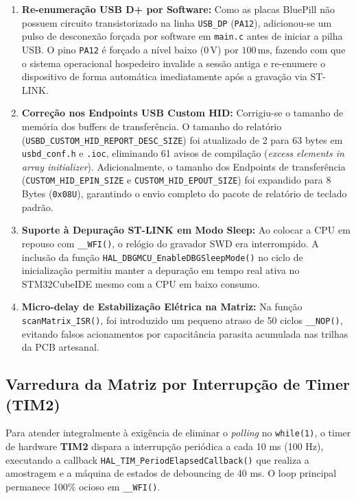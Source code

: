 \documentclass[12pt, a4paper]{article}
\begin{document}
\begin{enumerate}
    \item \textbf{Re-enumeração USB D+ por Software:} Como as placas BluePill não possuem circuito transistorizado na linha \texttt{USB\_DP} (\texttt{PA12}), adicionou-se um pulso de desconexão forçada por software em \texttt{main.c} antes de iniciar a pilha USB. O pino \texttt{PA12} é forçado a nível baixo ($0\,\text{V}$) por $100\,\text{ms}$, fazendo com que o sistema operacional hospedeiro invalide a sessão antiga e re-enumere o dispositivo de forma automática imediatamente após a gravação via ST-LINK.
    \item \textbf{Correção nos Endpoints USB Custom HID:} Corrigiu-se o tamanho de memória dos buffers de transferência. O tamanho do relatório (\texttt{USBD\_CUSTOM\_HID\_REPORT\_DESC\_SIZE}) foi atualizado de 2 para 63 bytes em \texttt{usbd\_conf.h} e \texttt{.ioc}, eliminando 61 avisos de compilação (\textit{excess elements in array initializer}). Adicionalmente, o tamanho dos Endpoints de transferência (\texttt{CUSTOM\_HID\_EPIN\_SIZE} e \texttt{CUSTOM\_HID\_EPOUT\_SIZE}) foi expandido para 8 Bytes (\texttt{0x08U}), garantindo o envio completo do pacote de relatório de teclado padrão.
    \item \textbf{Suporte à Depuração ST-LINK em Modo Sleep:} Ao colocar a CPU em repouso com \texttt{\_\_WFI()}, o relógio do gravador SWD era interrompido. A inclusão da função \texttt{HAL\_DBGMCU\_EnableDBGSleepMode()} no ciclo de inicialização permitiu manter a depuração em tempo real ativa no STM32CubeIDE mesmo com a CPU em baixo consumo.
    \item \textbf{Micro-delay de Estabilização Elétrica na Matriz:} Na função \texttt{scanMatrix\_ISR()}, foi introduzido um pequeno atraso de 50 ciclos \texttt{\_\_NOP()}, evitando falsos acionamentos por capacitância parasita acumulada nas trilhas da PCB artesanal.
\end{enumerate}

\subsection{Varredura da Matriz por Interrupção de Timer (TIM2)}
\hspace*{1.25cm}Para atender integralmente à exigência de eliminar o \textit{polling} no \texttt{while(1)}, o timer de hardware \textbf{TIM2} dispara a interrupção periódica a cada 10 ms (100 Hz), executando a callback \texttt{HAL\_TIM\_PeriodElapsedCallback()} que realiza a amostragem e a máquina de estados de debouncing de 40 ms. O loop principal permanece 100\% ocioso em \texttt{\_\_WFI()}.
\end{document}
